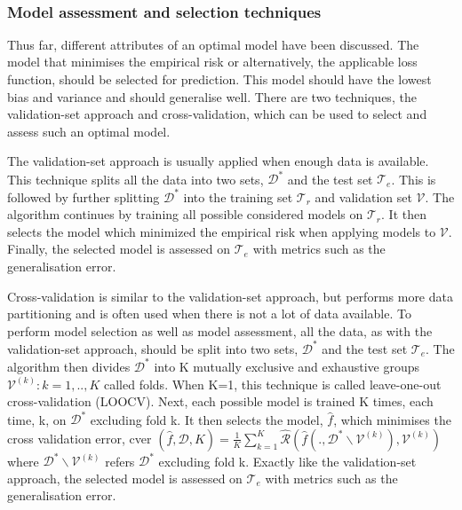 \documentclass[11pt]{article}
\begin{document}
    \begin{center}
    \end{center}
    { \hspace*{\fill} \\}
    
    \subsubsection{Model assessment and selection
techniques}\label{model-assessment-and-selection-techniques}

Thus far, different attributes of an optimal model have been discussed.
The model that minimises the empirical risk or alternatively, the
applicable loss function, should be selected for prediction. This model
should have the lowest bias and variance and should generalise well.
There are two techniques, the validation-set approach and
cross-validation, which can be used to select and assess such an optimal
model.

The validation-set approach is usually applied when enough data is
available. This technique splits all the data into two sets,
\(\mathcal{D}^*\) and the test set \(\mathcal{T}_e\). This is followed
by further splitting \(\mathcal{D}^*\) into the training set
\(\mathcal{T}_r\) and validation set \(\mathcal{V}\). The algorithm
continues by training all possible considered models on
\(\mathcal{T}_r\). It then selects the model which minimized the
empirical risk when applying models to \(\mathcal{V}\). Finally, the
selected model is assessed on \(\mathcal{T}_e\) with metrics such as the
generalisation error.

Cross-validation is similar to the validation-set approach, but performs
more data partitioning and is often used when there is not a lot of data
available. To perform model selection as well as model assessment, all
the data, as with the validation-set approach, should be split into two
sets, \(\mathcal{D}^*\) and the test set \(\mathcal{T}_e\). The
algorithm then divides \(\mathcal{D}^*\) into K mutually exclusive and
exhaustive groups \(\mathcal{V}^{(k)}:k=1,..,K\) called folds. When K=1,
this technique is called leave-one-out cross-validation (LOOCV). Next,
each possible model is trained K times, each time, k, on
\(\mathcal{D}^*\) excluding fold k. It then selects the model,
\(\hat{f}\), which minimises the cross validation error, cver
\((\hat{f},\mathcal{D},K)=\frac{1}{K}\sum^K_{k=1}\hat{\mathcal{R}}(\hat{f}(.,\mathcal{D}^*\backslash \mathcal{V}^{(k)}),\mathcal{V}^{(k)})\)
where \(\mathcal{D}^*\backslash \mathcal{V}^{(k)}\) refers
\(\mathcal{D}^*\) excluding fold k. Exactly like the validation-set
approach, the selected model is assessed on \(\mathcal{T}_e\) with
metrics such as the generalisation error.
\end{document}
